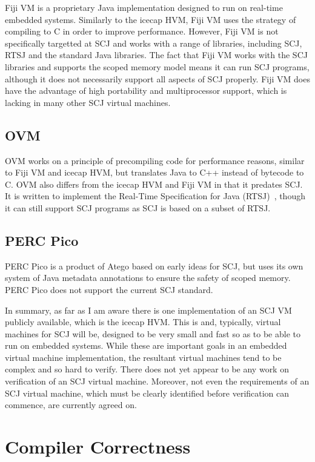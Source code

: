 \documentclass[a4paper,10pt]{report}
\begin{document}
Fiji VM is a proprietary Java implementation designed to run on real-time
embedded systems.  Similarly to the icecap HVM, Fiji VM uses the strategy of
compiling to C in order to improve performance.  However, Fiji VM is not
specifically targetted at SCJ and works with a range of libraries, including
SCJ, RTSJ and the standard Java libraries.  The fact that Fiji VM works with the
SCJ libraries and supports the scoped memory model means it can run SCJ
programs, although it does not necessarily support all aspects of SCJ properly.
Fiji VM does have the advantage of high portability and multiprocessor support,
which is lacking in many other SCJ virtual machines.

\subsection{OVM}

OVM works on a principle of precompiling code for performance reasons, similar
to Fiji VM and icecap HVM, but translates Java to C++ instead of bytecode to C.
OVM also differs from the icecap HVM and Fiji VM in that it predates SCJ. It is
written to implement the Real-Time Specification for Java
(RTSJ)~\cite{gosling2000}, though it can still support SCJ programs as SCJ is
based on a subset of RTSJ.

\subsection{PERC Pico}

PERC Pico is a product of Atego based on early ideas for SCJ, but uses its own
system of Java metadata annotations to ensure the safety of scoped memory. PERC
Pico does not support the current SCJ standard.

In summary, as far as I am aware there is one implementation of an SCJ VM
publicly available, which is the icecap HVM. This is and, typically, virtual
machines for SCJ will be, designed to be very small and fast so as to be able to
run on embedded systems.  While these are important goals in an embedded virtual
machine implementation, the resultant virtual machines tend to be complex and so
hard to verify.  There does not yet appear to be any work on verification of an
SCJ virtual machine.  Moreover, not even the requirements of an SCJ virtual
machine, which must be clearly identified before verification can commence, are
currently agreed on.

\section{Compiler Correctness}
\label{compiler-correctness-section}
\end{document}
